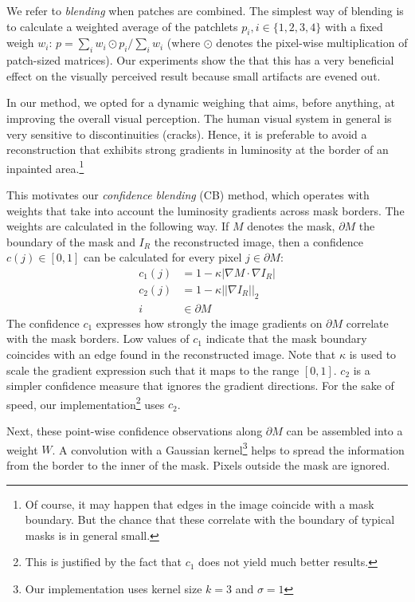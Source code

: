 We refer to \textit{blending} when patches are combined. The simplest way of blending is to calculate a weighted average of the patchlets $p_i, i\in\{1,2,3,4\}$ with a fixed weigh $w_i$: $p=\sum_i w_i \odot p_i/\sum_i w_i$ (where $\odot$ denotes the pixel-wise multiplication of patch-sized matrices). Our experiments show the that this has a very beneficial effect on the visually perceived result because small artifacts are evened out.

In our method, we opted for a dynamic weighing that aims, before anything, at improving the overall visual perception. 
The human visual system in general is very sensitive to discontinuities (cracks). Hence, it is preferable to avoid a reconstruction that exhibits strong gradients in luminosity at the border of an inpainted area.\footnote{Of course, it may happen that edges in the image coincide with a mask boundary. But the chance that these correlate with the boundary of typical masks is in general small.}

This motivates our \textit{confidence blending} (CB) method, which operates with weights that take into account the luminosity gradients across mask borders. The weights are calculated in the following way. If $M$ denotes the mask, $\partial M$ the boundary of the mask and $I_R$ the reconstructed image, then a confidence $c(j) \in [0,1]$ can be calculated for every pixel $j\in \partial M$:
\begin{align*}
c_1(j) &= 1-\kappa|\nabla M \cdot \nabla I_R|\\
c_2(j) &= 1-\kappa ||\nabla I_R||_2\\
i &\in \partial M
\end{align*}
The confidence $c_1$ expresses how strongly the image gradients on $\partial M$ correlate with the mask borders. Low values of $c_1$ indicate that the mask boundary coincides with an edge found in the reconstructed image. Note that $\kappa$ is used to scale the gradient expression such that it maps to the range $[0,1]$. $c_2$ is a simpler confidence measure that ignores the gradient directions. For the sake of speed, our implementation\footnote{This is justified by the fact that $c_1$ does not yield much better results.} uses $c_2$.

Next, these point-wise confidence observations along $\partial M$ can be assembled into a weight $W$. A convolution with a Gaussian kernel\footnote{Our implementation uses kernel size $k=3$ and $\sigma=1$} helps to spread the information from the border to the inner of the mask. Pixels outside the mask are ignored.

